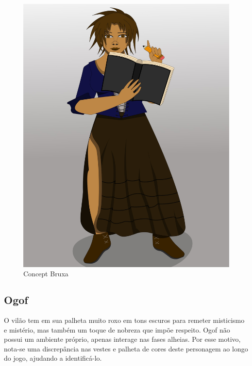 \begin{figure}[htb]
	\caption{\label{fig_conceptBruxa}Concept Bruxa}
	\begin{center}
	    \includegraphics[width=\textwidth/2]{imagens/capaportifolio.jpeg}
	\end{center}
\end{figure}


\clearpage

\subsection{Ogof}
O vilão tem em sua palheta muito roxo em tons escuros para remeter misticismo e mistério, mas também um toque de nobreza que impõe respeito. Ogof não possui um ambiente próprio, apenas interage nas fases alheias. Por esse motivo, nota-se uma discrepância nas vestes e palheta de cores deste personagem ao longo do jogo, ajudando a identificá-lo.

